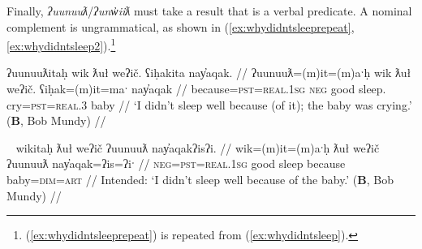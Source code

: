 
Finally, \textit{ʔuunuuƛ}/\textit{ʔunw̓iiƛ} must take a result that is a verbal predicate. A nominal complement is ungrammatical, as shown in (\ref{ex:whydidntsleeprepeat}, \ref{ex:whydidntsleep2}).\footnote{(\ref{ex:whydidntsleeprepeat}) is repeated from (\ref{ex:whydidntsleep}).}

\ex \label{ex:whydidntsleeprepeat}
\begingl
\glpreamble ʔuunuuƛitaḥ wik ƛuł weʔič. ʕiḥakita nay̓aqak. //
\gla ʔuunuuƛ=(m)it=(m)aˑḥ wik ƛuł weʔič. ʕiḥak=(m)it=maˑ nay̓aqak //
\glb because=\textsc{pst}=\textsc{real.1sg} \textsc{neg} good sleep. cry=\textsc{pst}=\textsc{real.3} baby //
\glft `I didn't sleep well because (of it); the baby was crying.' (\textbf{B}, Bob Mundy) //
\endgl
\xe

\ex~ \label{ex:whydidntsleep2}
\begingl
\glpreamble *wikitaḥ ƛuł weʔič ʔuunuuƛ nay̓aqakʔisʔi. //
\gla wik=(m)it=(m)aˑḥ ƛuł weʔič ʔuunuuƛ nay̓aqak=ʔis=ʔiˑ //
\glb \textsc{neg}=\textsc{pst}=\textsc{real.1sg} good sleep because baby=\textsc{dim}=\textsc{art} //
\glft Intended: `I didn't sleep well because of the baby.' (\textbf{B}, Bob Mundy) //
\endgl
\xe

\begin{comment}
\ex~ \label{ex:uunuutl4}
\begingl
\glpreamble *hitaʔapweʔin kaatkimqsuptaał t̓an̓eʔisʔi ʔuunuuƛ našuk. //
\gla hitaʔap=weˑʔin kaatkimqsuptaał t̓an̓a=ʔis=ʔiˑ ʔuunuuƛ našuk //
\glb win=\textsc{hrsy.3} race child=\textsc{dim}=\textsc{art} because strong //
\glft Intended: `The kid won the race because he is strong.' (\textbf{B}, Bob Mundy) //
\endgl
\xe

\vspace{5pt}
\end{comment}

\begin{comment}
Becausitives also follow the typical verbal pattern of being able to freely drop arguments, already seen in (\ref{ex:uunuutl1}) and again in (\ref{ex:becausechanged}).

\vspace{5pt}

Context for (\ref{ex:becausechanged}): A retelling of traditional ways of life. This followed an explanation of how this isn't done anymore, and a lengthy pause.

\ex~ \label{ex:becausechanged}
\begingl
\glpreamble ʔunʔuuƛ̓aƛʔał kʷiisḥin. //
\gla ʔunʔuuƛ=!aƛ=ʔał kʷis-L.ḥin //
\glb because=\textsc{now}=\textsc{pl} different-\textsc{dr} //
\glft `Because they're different now.' (\textbf{C}, \textit{tupaat} Julia Lucas) //
\endgl
\xe
\end{comment}

